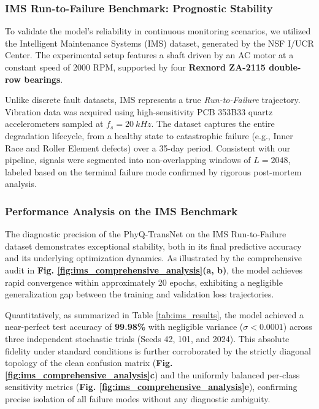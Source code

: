 \documentclass[5p,times,twocolumn]{elsarticle}
\begin{document}
\subsubsection{IMS Run-to-Failure Benchmark: Prognostic Stability}
To validate the model's reliability in continuous monitoring scenarios, we utilized the Intelligent Maintenance Systems (IMS) dataset, generated by the NSF I/UCR Center. The experimental setup features a shaft driven by an AC motor at a constant speed of 2000 RPM, supported by four \textbf{Rexnord ZA-2115 double-row bearings}.

Unlike discrete fault datasets, IMS represents a true \textit{Run-to-Failure} trajectory. Vibration data was acquired using high-sensitivity PCB 353B33 quartz accelerometers sampled at $f_s = \SI{20}{kHz}$. The dataset captures the entire degradation lifecycle, from a healthy state to catastrophic failure (e.g., Inner Race and Roller Element defects) over a 35-day period. Consistent with our pipeline, signals were segmented into non-overlapping windows of $L=2048$, labeled based on the terminal failure mode confirmed by rigorous post-mortem analysis.

\subsubsection{Performance Analysis on the IMS Benchmark}
The diagnostic precision of the PhyQ-TransNet on the IMS Run-to-Failure dataset demonstrates exceptional stability, both in its final predictive accuracy and its underlying optimization dynamics. As illustrated by the comprehensive audit in \textbf{Fig. \ref{fig:ims_comprehensive_analysis}(a, b)}, the model achieves rapid convergence within approximately 20 epochs, exhibiting a negligible generalization gap between the training and validation loss trajectories.

Quantitatively, as summarized in Table \ref{tab:ims_results}, the model achieved a near-perfect test accuracy of \textbf{99.98\%} with negligible variance ($\sigma < 0.0001$) across three independent stochastic trials (Seeds 42, 101, and 2024). This absolute fidelity under standard conditions is further corroborated by the strictly diagonal topology of the clean confusion matrix (\textbf{Fig. \ref{fig:ims_comprehensive_analysis}c}) and the uniformly balanced per-class sensitivity metrics (\textbf{Fig. \ref{fig:ims_comprehensive_analysis}e}), confirming precise isolation of all failure modes without any diagnostic ambiguity.
\end{document}
